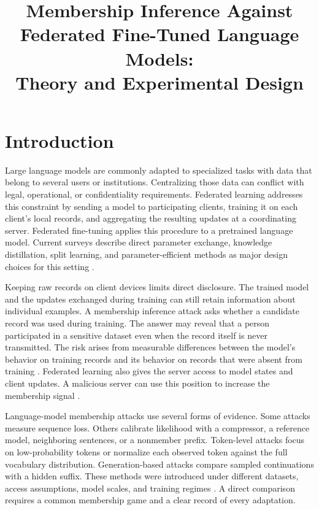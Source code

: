 \documentclass[11pt]{article}
\title{Membership Inference Against Federated Fine-Tuned Language Models:\\Theory and Experimental Design}
\author{}
\date{}
\begin{document}
\maketitle

\section{Introduction}

Large language models are commonly adapted to specialized tasks with data that belong to several users or institutions. Centralizing those data can conflict with legal, operational, or confidentiality requirements. Federated learning addresses this constraint by sending a model to participating clients, training it on each client's local records, and aggregating the resulting updates at a coordinating server. Federated fine-tuning applies this procedure to a pretrained language model. Current surveys describe direct parameter exchange, knowledge distillation, split learning, and parameter-efficient methods as major design choices for this setting \citep{yao2026federated,yan2025federated,wu2026survey,cheng2025toward}.

Keeping raw records on client devices limits direct disclosure. The trained model and the updates exchanged during training can still retain information about individual examples. A membership inference attack asks whether a candidate record was used during training. The answer may reveal that a person participated in a sensitive dataset even when the record itself is never transmitted. The risk arises from measurable differences between the model's behavior on training records and its behavior on records that were absent from training \citep{yeom2018privacy}. Federated learning also gives the server access to model states and client updates. A malicious server can use this position to increase the membership signal \citep{nguyen2023active,nguyen2025theoretically}.

Language-model membership attacks use several forms of evidence. Some attacks measure sequence loss. Others calibrate likelihood with a compressor, a reference model, neighboring sentences, or a nonmember prefix. Token-level attacks focus on low-probability tokens or normalize each observed token against the full vocabulary distribution. Generation-based attacks compare sampled continuations with a hidden suffix. These methods were introduced under different datasets, access assumptions, model scales, and training regimes \citep{carlini2021extracting,shi2024detecting,mattern2023membership,zhang2025minkpp,xie2024recall,kaneko2024sampling,fu2024membership,chen2026window}. A direct comparison requires a common membership game and a clear record of every adaptation.
\end{document}
